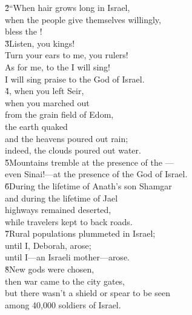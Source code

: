 \begin{poetry}
\poeml \v{2}``When hair grows long in Israel, \\
\poemll    when the people give themselves willingly, \\
\poemlll       bless the ! \\
\poeml \v{3}Listen, you kings! \\
\poemll    Turn your ears to me, you rulers! \\
\poeml As for me, to the  I will sing! \\
\poemll    I will sing praise to the  God of Israel. \\
\poeml \v{4}, when you left Seir, \\
\poemll    when you marched out \\
\poemlll       from the grain field of Edom, \\
\poeml the earth quaked \\
\poemll    and the heavens poured out rain; \\
\poemlll       indeed, the clouds poured out water. \\
\poeml \v{5}Mountains tremble at the presence of the  --- \\
\poemll    even Sinai!---at the presence of the  God of Israel. \\
\poeml \v{6}During the lifetime of Anath's son Shamgar \\
\poemll    and during the lifetime of Jael \\
\poeml highways remained deserted, \\
\poemll    while travelers kept to back roads. \\
\poeml \v{7}Rural populations plummeted in Israel; \\
\poemll    until I, Deborah, arose; \\
\poemlll       until I---an Israeli mother---arose. \\
\poeml \v{8}New gods were chosen, \\
\poemll    then war came to the city gates, \\
\poeml but there wasn't a shield or spear to be seen \\
\poemll    among 40,000 soldiers of Israel. \\

\end{poetry}
